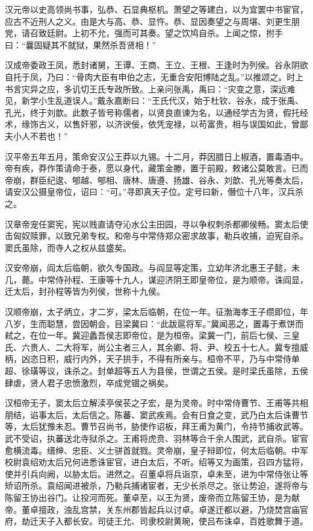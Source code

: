 \documentclass[a4paper,12pt,UTF8,twoside]{ctexbook}
\begin{document}
    汉元帝以史高领尚书事，弘恭、石显典枢机。萧望之等建白，以为宜罢中书宦官，应古不近刑人之义。由是大与高、恭、显忤。恭、显因奏望之与周堪、刘更生朋党，请召致廷尉。上初不允，强而可其奏。望之饮鸠自杀。上闻之惊，拊手曰：“曩固疑其不就狱，果然杀吾贤相！”
    
    汉成帝委政王凤，悉封诸舅，王谭、王商、王立、王根、王逢时为列侯。谷永阴欲自托于凤，乃曰：“骨肉大臣有申伯之志，无重合安阳博陆之乱。”以推颂之。时上书言灾异之应，多讥切王氏专政所致。上亲问张禹，禹曰：“灾变之意，深远难见，新学小生乱道误人。”戴永嘉断曰：“王氏代汉，始于杜钦、谷永，成于张禹、孔光，终于刘歆。此数子皆号称儒者，以贤良直谏为名，以通经学古为贤，假托经术，缘饰古义，以售奸邪，以济谀佞，依凭宠禄，以苟富贵，相与误国如此，曾鄙夫小人不若也！”
    
    汉平帝五年五月，策命安汉公王莽以九锡。十二月，莽因腊日上椒酒，置毒酒中。帝有疾，莽作策请命于泰，愿以身代，藏策金滕，置于前殿，敕诸公莫敢言。已而帝崩，群臣纪逡、郇越、郇相、唐林、唐遵、扬雄、谷永、刘歆、孔光等奏太后，请安汉公摄皇帝位，诏曰：“可。”寻即真天子位。定号曰新，僭位十八年，汉兵杀之。
    
    汉章帝宠任窦宪，宪以贱直请夺沁水公主田园，寻以争权刺杀都卿侯畅。窦太后使击匈奴赎罪，以致兄弟专权。和帝与中常侍郑众密求故事，勒兵收捕，迫宪自杀。窦氏虽除，而寺人之权从兹盛矣。
    
    汉安帝崩，阎太后临朝，欲久专国政。与阎显等定策，立幼年济北惠王子懿，未几，薨。中常侍孙程、王康等十九人，谋迎济阴王即皇帝位，是为顺帝。诛阎显，迁太后，封孙程等皆为列侯，世称十九侯。
    
    汉顺帝崩，太子炳立，才二岁，梁太后临朝，在位一年。征渤海孝王子缵即位，年八岁，生而聪慧，尝因朝会，目梁冀曰：“此跋扈将军。”冀闻恶之，置毒于煮饼而弒之，在位一年。冀迎蠡吾侯志即帝位，是为桓帝。梁冀一门，前后七侯、三皇氏、六贵人、二大将军，尚公主者三人，其余卿、将、尹、校五十七人。冀专擅威柄，凶恣日积，威行内外，天子拱手，不得有所亲与。桓帝不平，乃与中常侍单超、徐璜等议，诛杀之。封单超等五人为县侯，世谓之五侯。是时梁氏虽除，五侯肆虐，贤人君子忠愤激烈，卒成党锢之祸矣。
    
    汉桓帝无子，窦太后立解渎亭侯苌之子宏，是为灵帝。时中常侍曹节、王甫等共相朋结，谄事太后，太后信之。陈蕃、窦武疾焉。会有日食之变，武乃白太后诛曹节等，太后犹豫未忍。曹节召尚书，胁使作诏板，拜王甫为黄门，令持节捕收武等。武不受诏，执蕃送北寺狱杀之。王甫将虎贲、羽林等合千余人围武，武自杀。宦官愈横流毒。缙绅、忠臣、义士骈首就戮。灵帝崩，皇子辩即位，何太后临朝。中军校尉袁绍劝太后兄何进悉诛宦官，进白太后，不听。绍等又为画策，召四方猛将，使并引兵向阙，以胁太后。进然之。召董卓将兵诣京，卓未至，进为中常侍张让等矫诏所杀。袁绍闻进被杀，乃勒兵捕诸宦者，无少长杀尽之。张让势迫，遂将帝与陈留王协出谷门。让投河而死。董卓至，以王为贤，废帝而立陈留王协，是为献帝。董卓擅政，浊乱宫禁，关东州郡皆起兵以讨卓。卓遂迁都以避，乃烧焚宫庙官府，劫迁天子入都长安。司徒王允、司隶校尉黄琬，使吕布诛卓，百姓歌舞于道。
    
\end{document}
